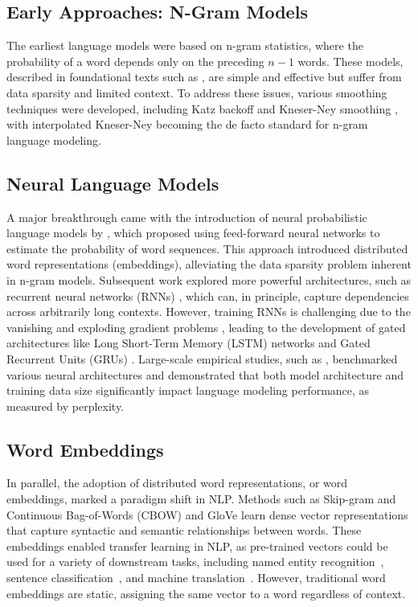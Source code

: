 \subsection{Early Approaches: N-Gram Models}
The earliest language models were based on n-gram statistics, where the probability of a word depends only on the preceding $n-1$ words. These models, described in foundational texts such as \cite{jurafsky2025speech}, are simple and effective but suffer from data sparsity and limited context. To address these issues, various smoothing techniques were developed, including Katz backoff \citep{katz2003estimation} and Kneser-Ney smoothing \citep{kneser1995improved}, with interpolated Kneser-Ney \citep{chen1999empirical} becoming the de facto standard for n-gram language modeling.

\subsection{Neural Language Models}

A major breakthrough came with the introduction of neural probabilistic language models by \cite{bengio2003neural}, which proposed using feed-forward neural networks to estimate the probability of word sequences. This approach introduced distributed word representations (embeddings), alleviating the data sparsity problem inherent in n-gram models. Subsequent work explored more powerful architectures, such as recurrent neural networks (RNNs) \citep{mikolov2010recurrent}, which can, in principle, capture dependencies across arbitrarily long contexts. However, training RNNs is challenging due to the vanishing and exploding gradient problems \citep{bengio1994learning}, leading to the development of gated architectures like Long Short-Term Memory (LSTM) networks \citep{hochreiter1997lstm} and Gated Recurrent Units (GRUs) \citep{cho2014gru}.
Large-scale empirical studies, such as \cite{jozefowicz2016exploring}, benchmarked various neural architectures and demonstrated that both model architecture and training data size significantly impact language modeling performance, as measured by perplexity.
\subsection{Word Embeddings}
In parallel, the adoption of distributed word representations, or word embeddings, marked a paradigm shift in NLP. Methods such as Skip-gram and Continuous Bag-of-Words (CBOW) \citep{mikolov2013efficient, mikolov2013distributed} and GloVe \citep{pennington2014glove} learn dense vector representations that capture syntactic and semantic relationships between words. These embeddings enabled transfer learning in NLP, as pre-trained vectors could be used for a variety of downstream tasks, including named entity recognition~\citep{lample2016neural}, sentence classification~\citep{kim2014convolutional}, and machine translation~\citep{qi2018translation}. However, traditional word embeddings are static, assigning the same vector to a word regardless of context.

